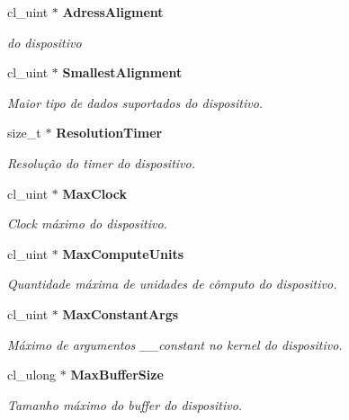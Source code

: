 \begin{DoxyCompactItemize}
cl\+\_\+uint $\ast$ \textbf{ Adress\+Aligment}
\begin{DoxyCompactList}\small\item\em do dispositivo \end{DoxyCompactList}\item 
\mbox{\label{structdevices_a060bc9304113f2b9e14cda4a7c2cb38e}} 
cl\+\_\+uint $\ast$ \textbf{ Smallest\+Alignment}
\begin{DoxyCompactList}\small\item\em Maior tipo de dados suportados do dispositivo. \end{DoxyCompactList}\item 
\mbox{\label{structdevices_aaa9dd094d6ffb909be80c312216479ed}} 
size\+\_\+t $\ast$ \textbf{ Resolution\+Timer}
\begin{DoxyCompactList}\small\item\em Resolução do timer do dispositivo. \end{DoxyCompactList}\item 
\mbox{\label{structdevices_a386df2295358d2717730bc1db4539671}} 
cl\+\_\+uint $\ast$ \textbf{ Max\+Clock}
\begin{DoxyCompactList}\small\item\em Clock máximo do dispositivo. \end{DoxyCompactList}\item 
\mbox{\label{structdevices_aec780718e368f1df19727f500a921c7d}} 
cl\+\_\+uint $\ast$ \textbf{ Max\+Compute\+Units}
\begin{DoxyCompactList}\small\item\em Quantidade máxima de unidades de cômputo do dispositivo. \end{DoxyCompactList}\item 
\mbox{\label{structdevices_adfc4f33bb5055dc345007f64acbe7feb}} 
cl\+\_\+uint $\ast$ \textbf{ Max\+Constant\+Args}
\begin{DoxyCompactList}\small\item\em Máximo de argumentos \+\_\+\+\_\+constant no kernel do dispositivo. \end{DoxyCompactList}\item 
\mbox{\label{structdevices_aa075a9705e12e7e949f89b1306f59585}} 
cl\+\_\+ulong $\ast$ \textbf{ Max\+Buffer\+Size}
\begin{DoxyCompactList}\small\item\em Tamanho máximo do buffer do dispositivo. \end{DoxyCompactList}\item 
\mbox{\label{structdevices_a3969a7352c8edd8b1b057630a0d7e8e1}} 

\end{DoxyCompactItemize}
